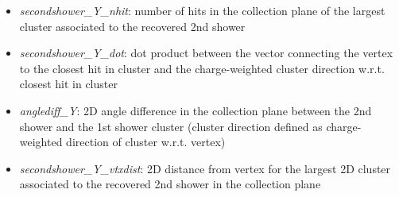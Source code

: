 \begin{itemize}
    \item \emph{secondshower\_Y\_nhit}: number of hits in the collection plane of the largest cluster associated to the  recovered 2nd shower
    \item \emph{secondshower\_Y\_dot}: dot product between the vector connecting the vertex to the closest hit in cluster and the charge-weighted cluster direction w.r.t. closest hit in cluster
    \item \emph{anglediff\_Y}: 2D angle difference in the collection plane between the 2nd shower and the 1st shower cluster  (cluster direction defined as charge-weighted direction of cluster w.r.t. vertex)
    \item \emph{secondshower\_Y\_vtxdist}: 2D distance from vertex for the largest 2D cluster associated to the  recovered 2nd shower in the collection plane
\end{itemize}
